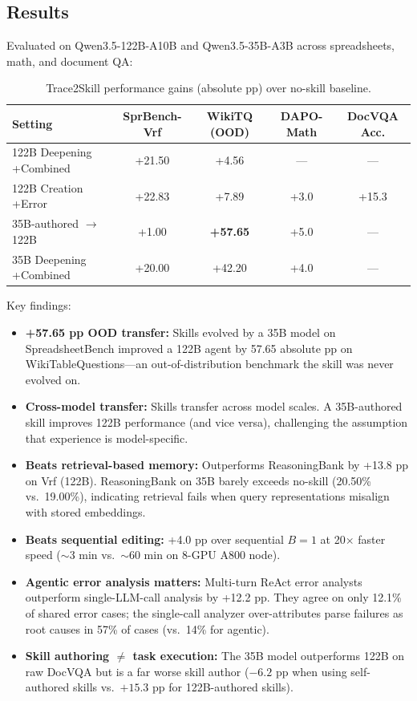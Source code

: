 \documentclass[11pt]{article}
\begin{document}
\subsection{Results}

Evaluated on Qwen3.5-122B-A10B and Qwen3.5-35B-A3B across spreadsheets, math, and document QA:

\begin{table}[h]
\centering
\caption{Trace2Skill performance gains (absolute pp) over no-skill baseline.}
\begin{tabular}{lcccc}
\toprule
\textbf{Setting} & \textbf{SprBench-Vrf} & \textbf{WikiTQ (OOD)} & \textbf{DAPO-Math} & \textbf{DocVQA Acc.} \\
\midrule
122B Deepening +Combined & +21.50 & +4.56 & --- & --- \\
122B Creation +Error & +22.83 & +7.89 & +3.0 & +15.3 \\
35B-authored $\to$ 122B & +1.00 & \textbf{+57.65} & +5.0 & --- \\
35B Deepening +Combined & +20.00 & +42.20 & +4.0 & --- \\
\bottomrule
\end{tabular}
\end{table}

Key findings:
\begin{itemize}
    \item \textbf{+57.65 pp OOD transfer:} Skills evolved by a 35B model on SpreadsheetBench improved a 122B agent by 57.65 absolute pp on WikiTableQuestions---an out-of-distribution benchmark the skill was never evolved on.
    \item \textbf{Cross-model transfer:} Skills transfer across model scales. A 35B-authored skill improves 122B performance (and vice versa), challenging the assumption that experience is model-specific.
    \item \textbf{Beats retrieval-based memory:} Outperforms ReasoningBank by +13.8 pp on Vrf (122B). ReasoningBank on 35B barely exceeds no-skill (20.50\% vs.\ 19.00\%), indicating retrieval fails when query representations misalign with stored embeddings.
    \item \textbf{Beats sequential editing:} +4.0 pp over sequential $B=1$ at 20$\times$ faster speed ($\sim$3 min vs.\ $\sim$60 min on 8-GPU A800 node).
    \item \textbf{Agentic error analysis matters:} Multi-turn ReAct error analysts outperform single-LLM-call analysis by +12.2 pp. They agree on only 12.1\% of shared error cases; the single-call analyzer over-attributes parse failures as root causes in 57\% of cases (vs.\ 14\% for agentic).
    \item \textbf{Skill authoring $\neq$ task execution:} The 35B model outperforms 122B on raw DocVQA but is a far worse skill author ($-6.2$ pp when using self-authored skills vs.\ $+15.3$ pp for 122B-authored skills).
\end{itemize}
\end{document}
